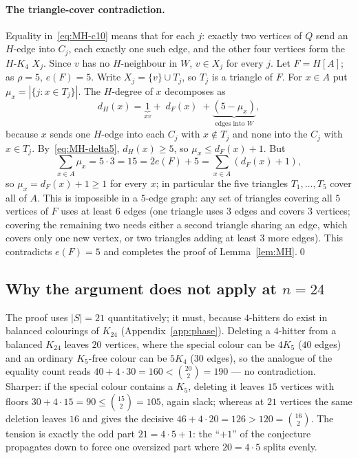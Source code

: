 \documentclass[11pt,reqno]{amsart}
\theoremstyle{definition}
\theoremstyle{remark}
\newcommand{\abs}[1]{\left|#1\right|}
\begin{document}
\paragraph{The triangle-cover contradiction.}
Equality in~\eqref{eq:MH-c10} means that for each $j$: exactly two vertices of $Q$
send an $H$-edge into $C_j$, each exactly one such edge, and the other four vertices
form the $H$-$K_4$ $X_j$. Since $v$ has no $H$-neighbour in $W$, $v\in X_j$ for every
$j$. Let $F=H[A]$; as $\rho=5$, $e(F)=5$. Write $X_j=\{v\}\cup T_j$, so $T_j$ is a
triangle of $F$. For $x\in A$ put $\mu_x=\abs{\{j:x\in T_j\}}$. The $H$-degree of
$x$ decomposes as
\[
  d_H(x)=\underbrace{1}_{xv}+\;d_F(x)\;+\underbrace{(5-\mu_x)}_{\text{edges into }W},
\]
because $x$ sends one $H$-edge into each $C_j$ with $x\notin T_j$ and none into the
$C_j$ with $x\in T_j$. By~\eqref{eq:MH-delta5}, $d_H(x)\ge 5$, so $\mu_x\le
d_F(x)+1$. But
\[
  \sum_{x\in A}\mu_x=5\cdot 3=15=2e(F)+5=\sum_{x\in A}(d_F(x)+1),
\]
so $\mu_x=d_F(x)+1\ge 1$ for every $x$; in particular the five triangles
$T_1,\dots,T_5$ cover all of $A$. This is impossible in a $5$-edge graph: any set of
triangles covering all $5$ vertices of $F$ uses at least $6$ edges (one triangle
uses $3$ edges and covers $3$ vertices; covering the remaining two needs either a
second triangle sharing an edge, which covers only one new vertex, or two triangles
adding at least $3$ more edges). This contradicts $e(F)=5$ and completes the proof
of Lemma~\ref{lem:MH}.\qed

\subsection{Why the argument does not apply at $n=24$}\label{ssec:MH-n24}
The proof uses $\abs S=21$ quantitatively; it must, because $4$-hitters do exist in
balanced colourings of $K_{24}$ (Appendix~\ref{app:phase}). Deleting a $4$-hitter
from a balanced $K_{24}$ leaves $20$ vertices, where the special colour can be
$4K_5$ ($40$ edges) and an ordinary $K_5$-free colour can be $5K_4$ ($30$ edges),
so the analogue of the equality count reads $40+4\cdot 30=160<\binom{20}2=190$ ---
no contradiction. Sharper: if the special colour contains a $K_5$, deleting it
leaves $15$ vertices with floors $30+4\cdot 15=90\le\binom{15}2=105$, again slack;
whereas at $21$ vertices the same deletion leaves $16$ and gives the decisive
$46+4\cdot 20=126>120=\binom{16}2$. The tension is exactly the odd part
$21=4\cdot 5+1$: the ``$+1$'' of the conjecture propagates down to force one
oversized part where $20=4\cdot 5$ splits evenly.
\end{document}
